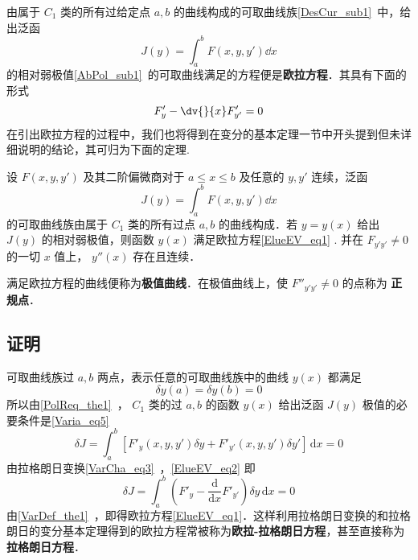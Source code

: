 
由属于 $C_1$ 类的所有过给定点 $a,b$ 的曲线构成的可取曲线族\autoref{DesCur_sub1}~中，给出泛函 
\begin{equation}
J(y)=\int_a^bF(x,y,y')\dd x
\end{equation}
的相对弱极值\autoref{AbPol_sub1}~的可取曲线满足的方程便是\textbf{欧拉方程}．其具有下面的形式
\begin{equation}\label{ElueEV_eq1}
F'_y-\dv{}{x}F'_{y'}=0
\end{equation}
在引出欧拉方程的过程中，我们也将得到在变分的基本定理一节中开头提到但未详细说明的结论，其可归为下面的定理.
\begin{theorem}{}
设 $F(x,y,y')$ 及其二阶偏微商对于 $a\leq x\leq b$ 及任意的 $y,y'$ 连续，泛函
\begin{equation}
J(y)=\int_a^b F(x,y,y')\dd x
\end{equation}
的可取曲线族由属于 $C_1$ 类的所有过点 $a,b$ 的曲线构成．若 $y=y(x)$ 给出 $J(y)$ 的相对弱极值，则函数 $y(x)$ 满足欧拉方程\autoref{ElueEV_eq1} .
并在 $F_{y'y'}\neq0$ 的一切 $x$ 值上， $y''(x)$ 存在且连续．

\end{theorem}
满足欧拉方程的曲线便称为\textbf{极值曲线}．在极值曲线上，使 $F''_{y'y'}\neq0$ 的点称为 \textbf{正规点}．
\subsection{证明}
可取曲线族过 $a,b$ 两点，表示任意的可取曲线族中的曲线 $y(x)$ 都满足 
\begin{equation}
\delta y(a)=\delta y(b)=0
\end{equation}
所以由\autoref{PolReq_the1}~， $C_1$ 类的过 $a,b$ 的函数 $y(x)$ 给出泛函 $J(y)$ 极值的必要条件是\autoref{Varia_eq5}~
\begin{equation}\label{ElueEV_eq2}
\delta J=\int_a^b \left[F'_y(x,y,y')\delta y+F'_{y'}(x,y,y')\delta y' \right]  \,\mathrm{d}{x} =0
\end{equation}
由拉格朗日变换\autoref{VarCha_eq3}~，\autoref{ElueEV_eq2} 即
\begin{equation}
\delta J=\int_a^b \left(F'_y- \frac{\mathrm{d}{}}{\mathrm{d}{x}} F'_{y'} \right) \delta y \,\mathrm{d}{x} =0
\end{equation}
由\autoref{VarDef_the1}~，即得欧拉方程\autoref{ElueEV_eq1}．这样利用拉格朗日变换的和拉格朗日的变分基本定理得到的欧拉方程常被称为\textbf{欧拉-拉格朗日方程}，甚至直接称为\textbf{拉格朗日方程}．

